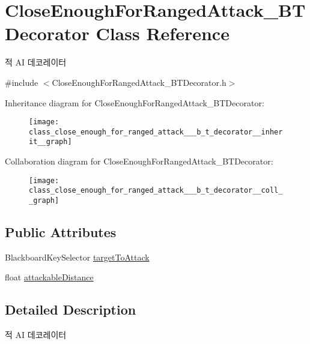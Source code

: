 \hypertarget{class_close_enough_for_ranged_attack___b_t_decorator}{}\section{Close\+Enough\+For\+Ranged\+Attack\+\_\+\+B\+T\+Decorator Class Reference}
\label{class_close_enough_for_ranged_attack___b_t_decorator}


적 AI 데코레이터  




{\ttfamily \#include $<$Close\+Enough\+For\+Ranged\+Attack\+\_\+\+B\+T\+Decorator.\+h$>$}



Inheritance diagram for Close\+Enough\+For\+Ranged\+Attack\+\_\+\+B\+T\+Decorator\+:
\nopagebreak
\begin{figure}[H]
\begin{center}
\leavevmode
\texttt{[image: class\_close\_enough\_for\_ranged\_attack\_\_\_b\_t\_decorator\_\_inherit\_\_graph]}
\end{center}
\end{figure}


Collaboration diagram for Close\+Enough\+For\+Ranged\+Attack\+\_\+\+B\+T\+Decorator\+:
\nopagebreak
\begin{figure}[H]
\begin{center}
\leavevmode
\texttt{[image: class\_close\_enough\_for\_ranged\_attack\_\_\_b\_t\_decorator\_\_coll\_\_graph]}
\end{center}
\end{figure}
\subsection*{Public Attributes}
\begin{DoxyCompactItemize}
\item 
Blackboard\+Key\+Selector \hyperlink{class_close_enough_for_ranged_attack___b_t_decorator_a830126ebaba4083a84ea549114ef39d7}{target\+To\+Attack}
\item 
float \hyperlink{class_close_enough_for_ranged_attack___b_t_decorator_a28155d62ff5f45740dad3dfec7254e5e}{attackable\+Distance}
\end{DoxyCompactItemize}


\subsection{Detailed Description}
적 AI 데코레이터 

